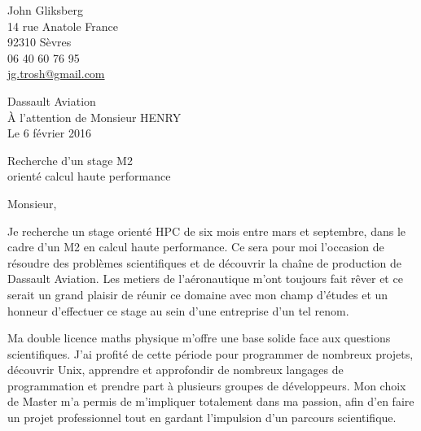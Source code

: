 \documentclass[12pt,a4paper]{article}
\begin{document}
\begin{minipage}{.5\textwidth}
\begin{flushleft}
John Gliksberg \\
14 rue Anatole France \\
92310 Sèvres \\
06 40 60 76 95 \\
\href{mailto:jg.trosh@gmail.com}
{jg.trosh@gmail.com}
\end{flushleft}
\end{minipage}

{
    \hspace*{\fill}
    \begin{minipage}{.5\textwidth}
    \begin{flushleft}
        Dassault Aviation \\
        \`A l’attention de Monsieur HENRY \\[.07in]
    Le 6 février 2016
    \end{flushleft}
    \end{minipage}
}

\vspace*{\fill}

\begin{center}
    \large
    Recherche d'un stage M2 \\
    orienté calcul haute performance
\end{center}

\vspace*{\fill}

Monsieur,

Je recherche un stage orienté HPC de six mois entre mars et septembre,
dans le cadre d'un M2 en calcul haute performance.
Ce sera pour moi l'occasion de résoudre des problèmes scientifiques
et de découvrir la chaîne de production de Dassault Aviation.
Les metiers de l’aéronautique m’ont toujours fait rêver et
ce serait un grand plaisir de réunir ce domaine avec mon
champ d’études et un honneur d’effectuer ce stage au sein
d’une entreprise d’un tel renom.

Ma double licence maths physique m'offre
une base solide face aux questions scientifiques.
J'ai profité de cette période pour programmer de nombreux projets,
découvrir Unix, apprendre et approfondir de nombreux langages de programmation
et prendre part à plusieurs groupes de développeurs.
Mon choix de Master m'a permis de m'impliquer totalement dans ma passion,
afin d'en faire un projet professionnel tout en gardant
l'impulsion d'un parcours scientifique.
\end{document}

